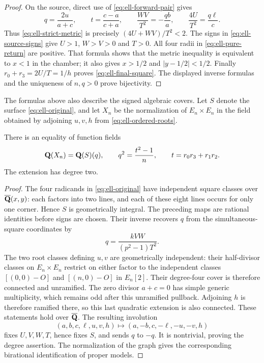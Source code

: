 \begin{proof}
On the source, direct use of \eqref{eq:ell-forward-pair} gives
\begin{equation}\label{eq:ell-metric-identities}
 q=\frac{2u}{a+c},\qquad
 t=\frac{c-a}{c+a},\qquad
 \frac{WV}{T^2}=-\frac{qb}{a},\qquad
 \frac{4U}{T^2}=\frac{q\ell}{c}.
\end{equation}
Thus \eqref{eq:ell-strict-metric} is precisely
$(4U+WV)/T^2<2$.  The signs in \eqref{eq:ell-source-signs}
give $U>1$, $W>V>0$ and $T>0$.  All four radii in
\eqref{eq:ell-pure-return} are positive.  That formula shows that
the metric inequality is equivalent to $x<1$ in the chamber;
it also gives $x>1/2$ and $|y-1/2|<1/2$.
Finally $r_0+r_3=2U/T=1/h$ proves
\eqref{eq:ell-final-square}.  The displayed inverse formulas and the
uniqueness of $n,q>0$ prove bijectivity.
\end{proof}

The formulas above also describe the signed algebraic covers.  Let $S$
denote the surface \eqref{eq:ell-original}, and let $X_n$ be the
normalization of $E_n\times E_n$ in the field obtained by adjoining
$u,v,h$ from \eqref{eq:ell-ordered-roots}.
\begin{proposition}\label{prop:ell-original-cover}
There is an equality of function fields
\[
 \mathbf Q(X_n)=\mathbf Q(S)(q),\qquad q^2=\frac{t^2-1}{n},
 \qquad t=r_0r_3+r_1r_2.
\]
The extension has degree two.
\end{proposition}
\begin{proof}
The four radicands in \eqref{eq:ell-original} have independent
square classes over $\overline{\mathbf Q}(x,y)$: each factors into two lines,
and each of these eight lines occurs for only one corner.  Hence
$S$ is geometrically integral.
The preceding maps are rational identities before signs are chosen.
Their inverse recovers $q$ from the simultaneous-square coordinates by
\[
 q=\frac{kVW}{(p^2-1)T^2}.
\]
The two root classes defining $u,v$ are geometrically independent:
their half-divisor classes on $E_n\times E_n$ restrict on either
factor to the independent classes
$[(0,0)-O]$ and $[(n,0)-O]$ in $E_n[2]$.
Their degree-four cover is therefore connected and unramified.
The zero divisor $a+c=0$ has simple generic multiplicity, which
remains odd after this unramified pullback.  Adjoining $h$ is
therefore ramified there, so this last quadratic extension is also
connected.  These statements hold over $\overline{\mathbf Q}$.
The resulting involution
\[
 (a,b,c,\ell,u,v,h)\longmapsto(a,-b,c,-\ell,-u,-v,h)
\]
fixes $U,V,W,T$, hence fixes $S$, and sends $q$ to $-q$.
It is nontrivial, proving the degree assertion.  The normalization of
the graph gives the corresponding birational identification of proper
models.
\end{proof}

